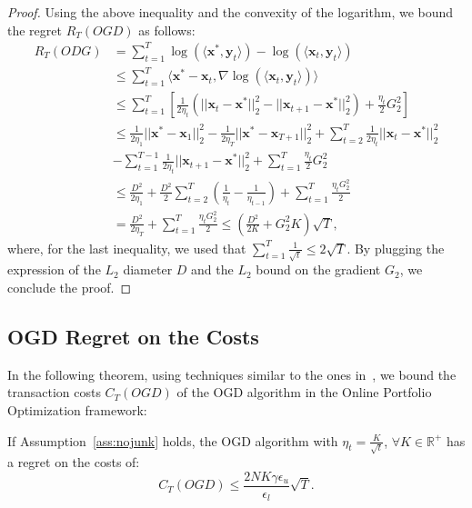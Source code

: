 \begin{proof}
Using the above inequality and the convexity of the logarithm, we bound the regret $R_T(OGD)$ as follows:
\begin{align*}
     R_T (ODG) &= \sum\limits_{t=1}^T\log (\langle \mathbf{x}^*, \mathbf{y}_t \rangle)-\log (\langle \mathbf{x}_t, \mathbf{y}_t \rangle) \\
    & \le\sum\limits_{t=1}^T\langle\mathbf{x}^*-\mathbf{x}_t,\nabla \log (\langle \mathbf{x}_t, \mathbf{y}_t \rangle)\rangle\\
    &\le\sum\limits_{t=1}^T\left[\frac{1}{2\eta_t}\left(||\mathbf{x}_t-\mathbf{x}^*||_2^2-||\mathbf{x}_{t+1}-\mathbf{x}^*||_2^2\right)+\frac{\eta_t}{2}G_2^2\right]\\
    &\le\frac{1}{2\eta_1}||\mathbf x^*-\mathbf x_1||_2^2-\frac{1}{2\eta_T}||\mathbf x^*-\mathbf x_{T+1}||_2^2+\sum\limits_{t=2}^T\frac{1}{2\eta_t}||\mathbf x_{t}-\mathbf x^*||_2^2\\
    &-\sum\limits_{t=1}^{T-1}\frac{1}{2\eta_t}||\mathbf x_{t+1}-\mathbf x^*||_2^2+\sum\limits_{t=1}^T\frac{\eta_t}{2}G_2^2\\
    &\le \frac{D^2}{2\eta_1}+\frac{D^2}{2}\sum\limits_{t=2}^{T}\left(\frac{1}{\eta_t}-\frac{1}{\eta_{t-1}}\right)+\sum\limits_{t=1}^T\frac{\eta_t G_2^2}{2}\\
    &=\frac{D^2}{2\eta_T}+\sum\limits_{t=1}^T\frac{\eta_tG_2^2}{2} \le \left(\frac{D^2}{2K}+G_2^2K\right)\sqrt{T},
\end{align*}
where, for the last inequality, we used that $\sum_{t=1}^T \frac{1}{\sqrt{t}} \leq 2 \sqrt{T}$.
By plugging the expression of the $L_2$ diameter $D$ and the $L_2$ bound on the gradient $G_2$, we conclude the proof.
\end{proof}

\subsection{OGD Regret on the Costs}
In the following theorem, using techniques similar to the ones in~\cite{andrew2013tale}, we bound the transaction costs $C_T(OGD)$ of the OGD algorithm in the Online Portfolio Optimization framework:
\begin{theorem}\label{th:tc_ogd}
    If Assumption~\ref{ass:nojunk} holds, the OGD algorithm with $\eta_t = \frac{K}{\sqrt{t}}$,  $\forall K \in \mathbb{R}^+$ has a regret on the costs of:
    \begin{equation*}
        C_T(OGD) \leq \frac{2 N K \gamma \epsilon_u}{\epsilon_l} \sqrt{T}.
    \end{equation*}
\end{theorem}

